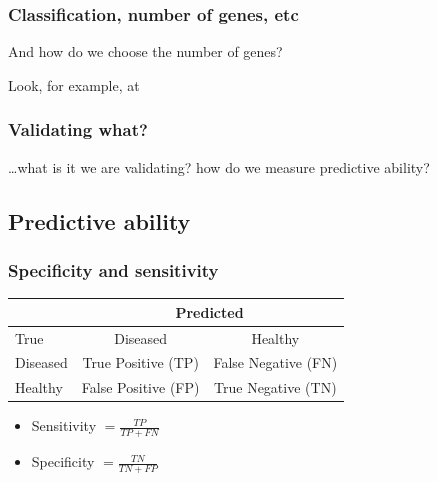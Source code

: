 \begin{frame}
\frametitle{Classification, number of genes, etc}
And how do we choose the number of genes?

\vspace*{15pt}
Look, for example, at 
\end{frame}




\begin{frame}
\frametitle{Validating what?}
\ldots what is it we are validating? how do we measure predictive ability?


\end{frame}


\subsection[Predictive ability]{Predictive ability}




\begin{frame}
\frametitle{Specificity and sensitivity}
\begin{center}

{\small
\begin{tabular}{l|cc}
 &\multicolumn{2}{c}{Predicted}\\
\hline
True & Diseased & Healthy\\
\hline
Diseased & True Positive (TP) & False Negative (FN)\\
Healthy & False Positive (FP) & True Negative (TN)\\
\hline
\end{tabular}
}
\end{center}


\begin{itemize}
\item Sensitivity $=\frac{TP}{TP + FN}$
\item Specificity $= \frac{TN}{TN + FP}$
\end{itemize}

\end{frame}


